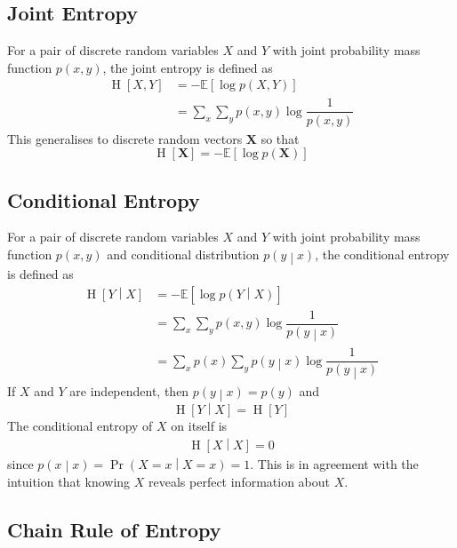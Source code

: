 \documentclass[11pt]{report} %
\begin{document}
\subsection{Joint Entropy}

For a pair of discrete random variables $X$ and $Y$ with joint probability mass function $p\left(x, y\right)$, the joint entropy is defined as
\begin{align}
\operatorname{H}\left[X, Y\right] &= -\mathbb{E}\left[\log p\left(X, Y\right)\right] \\
&= \sum_{x}\sum_{y}p\left(x, y\right)\log\dfrac{1}{p\left(x, y\right)}
\end{align}
This generalises to discrete random vectors $\mathbf{X}$ so that
\begin{equation}
\operatorname{H}\left[\mathbf{X}\right] = -\mathbb{E}\left[\log p\left(\mathbf{X}\right)\right]
\end{equation}

\subsection{Conditional Entropy}

For a pair of discrete random variables $X$ and $Y$ with joint probability mass function $p\left(x, y\right)$ and conditional distribution $p\left(y\middle|x\right)$, the conditional entropy is defined as
\begin{align}
\operatorname{H}\left[Y\middle|X\right] &= - \mathbb{E}\left[\log p\left(Y\middle|X\right)\right] \\
&= \sum_{x}\sum_{y}p\left(x, y\right)\log\dfrac{1}{p\left(y\middle|x\right)} \\
&= \sum_{x}p\left(x\right)\sum_{y}p\left(y\middle|x\right)\log\dfrac{1}{p\left(y\middle|x\right)}
\end{align}
If $X$ and $Y$ are independent, then $p\left(y\middle|x\right) = p\left(y\right)$ and
\begin{equation}
\operatorname{H}\left[Y\middle|X\right] = \operatorname{H}\left[Y\right]
\end{equation}
The conditional entropy of $X$ on itself is
\begin{align}
\operatorname{H}\left[X\middle|X\right] = 0
\end{align}
since $p\left(x\middle|x\right) = \operatorname{Pr}\left(X = x\middle|X = x\right) = 1$. This is in agreement with the intuition that knowing $X$ reveals perfect information about $X$.

\subsection{Chain Rule of Entropy}
\end{document}
